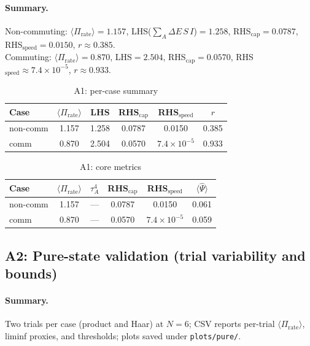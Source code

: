 \documentclass[10pt]{article}
\begin{document}
\paragraph{Summary.}
Non-commuting: $\langle\Pi_{\mathrm{rate}}\rangle=1.157$, LHS($\sum_A\Delta E\,S\,I$)$=1.258$, RHS$_{\mathrm{cap}}=0.0787$, RHS$_{\mathrm{speed}}=0.0150$, $r\approx0.385$.\\
Commuting: $\langle\Pi_{\mathrm{rate}}\rangle=0.870$, LHS$=2.504$, RHS$_{\mathrm{cap}}=0.0570$, RHS$_{\mathrm{speed}}\approx7.4\times10^{-5}$, $r\approx0.933$.

\begin{table}[!ht]
\centering
\caption{A1: per-case summary}
\label{tab:a1-summary}
\begin{tabular}{@{}lccccc@{}}
\toprule
Case & $\langle\Pi_{\mathrm{rate}}\rangle$ & LHS & RHS$_{\mathrm{cap}}$ & RHS$_{\mathrm{speed}}$ & $r$ \\
\midrule
non-comm & 1.157 & 1.258 & 0.0787 & 0.0150 & 0.385 \\
comm     & 0.870 & 2.504 & 0.0570 & $7.4\!\times\!10^{-5}$ & 0.933 \\
\bottomrule
\end{tabular}
\end{table}

\begin{table}[!ht]
\centering
\caption{A1: core metrics}
\label{tab:a1-core}
\begin{tabular}{@{}lccccc@{}}
\toprule
Case & $\langle\Pi_{\mathrm{rate}}\rangle$ & $\tau_A^4$ & RHS$_{\mathrm{cap}}$ & RHS$_{\mathrm{speed}}$ & $\langle\widehat{\Psi}\rangle$ \\
\midrule
non-comm & 1.157 & — & 0.0787 & 0.0150 & 0.061 \\
comm     & 0.870 & — & 0.0570 & $7.4\times10^{-5}$ & 0.059 \\
\bottomrule
\end{tabular}
\end{table}


\subsection{A2: Pure-state validation (trial variability and bounds)}\label{app:a2}


\paragraph{Summary.}
Two trials per case (product and Haar) at $N{=}6$; CSV reports per-trial $\langle\Pi_{\mathrm{rate}}\rangle$, liminf proxies, and thresholds; plots saved under \texttt{plots/pure/}.
\end{document}
